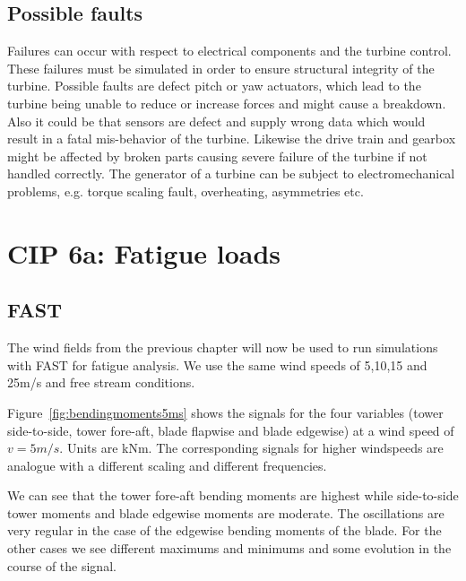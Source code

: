 \documentclass[10pt]{article}
\begin{document}
\subsection{Possible faults}
Failures can occur with respect to electrical components and the turbine control. These failures must be simulated in order to ensure structural integrity of the turbine. Possible faults are defect pitch or yaw actuators, which lead to the turbine being unable to reduce or increase forces and might cause a breakdown. Also it could be that sensors are defect and supply wrong data which would result in a fatal mis-behavior of the turbine. 
Likewise the drive train and gearbox might be affected by broken parts causing severe failure of the turbine if not handled correctly. The generator of a turbine can be subject to electromechanical problems, e.g. torque scaling fault, overheating, asymmetries etc.

\section{CIP 6a: Fatigue loads}
\subsection{FAST}
The wind fields from the previous chapter will now be used to run simulations with FAST for fatigue analysis.
We use the same wind speeds of 5,10,15 and 25m/s and free stream conditions. 

Figure~\ref{fig:bendingmoments5ms} shows the signals for the four variables (tower side-to-side, tower fore-aft, blade flapwise and blade edgewise) at a wind speed of $v=5m/s$. Units are kNm. The corresponding signals for higher windspeeds are analogue with a different scaling and different frequencies. 

We can see that the tower fore-aft bending moments are highest while side-to-side tower moments and blade edgewise moments are moderate. The oscillations are very regular in the case of the edgewise bending moments of the blade. For the other cases we see different maximums and minimums and some evolution in the course of the signal.
\end{document}

